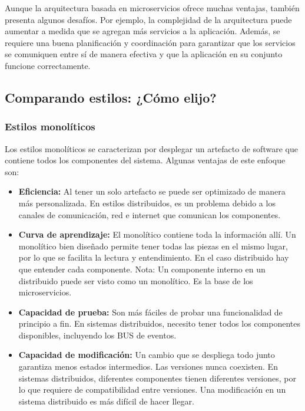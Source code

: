 \documentclass[executivepaper]{article}
\begin{document}
Aunque la arquitectura basada en microservicios ofrece muchas ventajas, también presenta algunos desafíos. Por ejemplo, la complejidad de la arquitectura puede aumentar a medida que se agregan más servicios a la aplicación. Además, se requiere una buena planificación y coordinación para garantizar que los servicios se comuniquen entre sí de manera efectiva y que la aplicación en su conjunto funcione correctamente.

\subsection{Comparando estilos: ¿Cómo elijo?}

\subsubsection*{Estilos monolíticos}

Los estilos monolíticos se caracterizan por desplegar un artefacto de software que contiene todos los componentes del sistema. Algunas ventajas de este enfoque son:

\begin{itemize}
\item \textbf{Eficiencia:} Al tener un solo artefacto se puede ser optimizado de manera más personalizada. En estilos distribuidos, es un problema debido a los canales de comunicación, red e internet que comunican los componentes.
\item \textbf{Curva de aprendizaje:} El monolítico contiene toda la información allí. Un monolítico bien diseñado permite tener todas las piezas en el mismo lugar, por lo que se facilita la lectura y entendimiento. En el caso distribuido hay que entender cada componente. Nota: Un componente interno en un distribuido puede ser visto como un monolítico. Es la base de los microservicios.
\item \textbf{Capacidad de prueba:} Son más fáciles de probar una funcionalidad de principio a fin. En sistemas distribuidos, necesito tener todos los componentes disponibles, incluyendo los BUS de eventos.
\item \textbf{Capacidad de modificación:} Un cambio que se despliega todo junto garantiza menos estados intermedios. Las versiones nunca coexisten. En sistemas distribuidos, diferentes componentes tienen diferentes versiones, por lo que requiere de compatibilidad entre versiones. Una modificación en un sistema distribuido es más difícil de hacer llegar.
\end{itemize}
\end{document}

